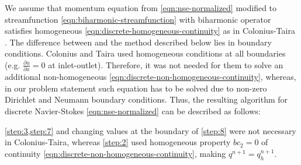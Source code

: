 \documentclass{article}
\numberwithin{equation}{section}
\begin{document}
We assume that momentum equation from \cref{eqn:nse-normalized} modified to streamfunction \cref{eqn:biharmonic-streamfunction} with biharmonic operator satisfies homogeneous \cref{eqn:discrete-homogeneous-continuity} as in Colonius-Taira \cite{Colonius:2008}. 
The difference between \cite{Colonius:2008} and the method described below lies in boundary conditions. Colonius and Taira used homogeneous conditions at all boundaries (e.g. $\frac{\partial u}{\partial x}=0$ at inlet-outlet). 
Therefore, it was not needed for them to solve an additional non-homogeneous \cref{eqn:discrete-non-homogeneous-continuity}, whereas, in our problem statement such equation has to be solved due to non-zero Dirichlet and Neumann boundary conditions.
Thus, the resulting algorithm for discrete Navier-Stokes \cref{eqn:nse-normalized} can be described as follows:
\cref{step:3,step:7} and changing values at the boundary of \cref{step:8} were not necessary in Colonius-Taira\cite{Colonius:2008}, whereas \cref{step:2} used homogeneous property $bc_2=0$ of continuity \cref{eqn:discrete-non-homogeneous-continuity}, making $q^{n+1}=q^{n+1}_h$.
\end{document}
